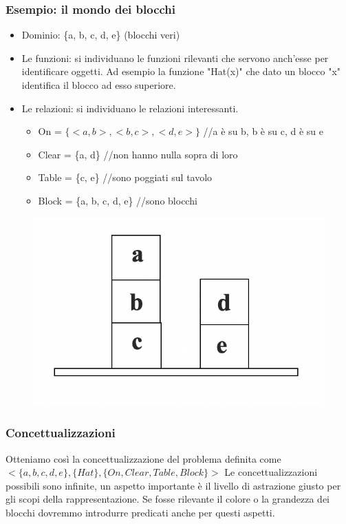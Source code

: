 \documentclass{article}
\begin{document}
\subsubsection{Esempio: il mondo dei blocchi}
\begin{itemize}
    \item Dominio: \{a, b, c, d, e\} (blocchi veri)
    \item Le funzioni: si individuano le funzioni rilevanti che servono anch’esse per identificare oggetti. Ad esempio la funzione "Hat(x)" che dato un blocco "x" identifica il blocco ad esso superiore.
    \item Le relazioni: si individuano le relazioni interessanti. \begin{itemize}
        \item On = $\{<a, b>, <b, c>, <d, e>\}$ //a è su b, b è su c, d è su e
        \item Clear = \{a, d\} //non hanno nulla sopra di loro
        \item Table = \{c, e\} //sono poggiati sul tavolo
        \item Block = \{a, b, c, d, e\} //sono blocchi
    \end{itemize} 
\end{itemize}
\begin{figure}[h!]
\centering
\includegraphics[scale=0.3]{Images/blocks.png}
\end{figure}
\subsubsection{Concettualizzazioni}
Otteniamo così la concettualizzazione del problema definita come \newline $<\{a, b, c, d, e\}, \{Hat\}, \{On, Clear, Table, Block\}>$ \newline
Le concettualizzazioni possibili sono infinite, un aspetto importante è il livello di astrazione giusto per gli scopi della rappresentazione. Se fosse rilevante il colore o la grandezza dei blocchi dovremmo introdurre predicati anche per questi aspetti.
\end{document}
